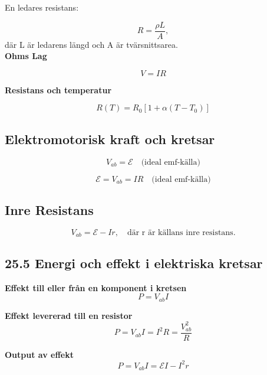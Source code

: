 \documentclass[a4paper]{article}
\begin{document}
En ledares resistans:

\begin{equation}
R = \dfrac{\rho L}{A},
\end{equation}
där L är ledarens längd och A är tvärsnittsarea.
\\

\textbf{Ohms Lag}

\begin{equation}
V = IR
\end{equation}

\textbf{Resistans och temperatur}

\begin{equation}
R(T) = R_0[1 + \alpha(T - T_0)]
\end{equation}
\newpage


\subsection*{Elektromotorisk kraft och kretsar}
\begin{equation}
V_{ab} =  \mathcal{E} \quad \text{(ideal emf-källa)}
\end{equation}


\begin{equation}
\mathcal{E} = V_{ab} = IR \quad \text{(ideal emf-källa)}
\end{equation}

\subsection*{Inre Resistans}
\begin{equation}
V_{ab} = \mathcal{E} - Ir, \quad \text{där r är källans inre resistans.}
\end{equation}

\subsection*{25.5 Energi och effekt i elektriska kretsar}

\textbf{Effekt till eller från en komponent i kretsen}
\begin{equation}
P=V_{ab}I
\end{equation}

\textbf{Effekt levererad till en resistor}
\begin{equation}
P = V_{ab}I = I^2R = \dfrac{V_{ab}^2}{R}
\end{equation}

\textbf{Output av effekt}
\begin{equation}
P = V_{ab}I = \mathcal{E}I - I^2r
\end{equation}
\end{document}
